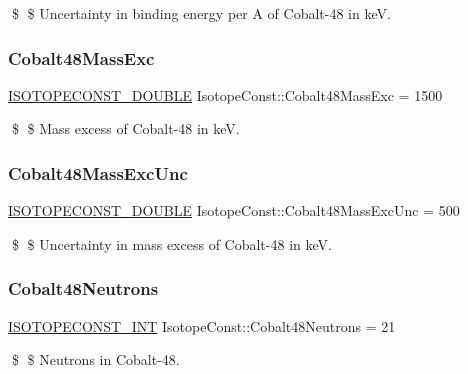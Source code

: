 \$ \$ Uncertainty in binding energy per A of Cobalt-\/48 in keV. \mbox{\label{group___isotope_const-_cobalt-_co48_ga537a142faa285ac28752f4d418c121f5}} 
\subsubsection{\texorpdfstring{Cobalt48\+Mass\+Exc}{Cobalt48MassExc}}
{\footnotesize\ttfamily \mbox{\hyperlink{group___isotope_const-_macros_ga8f45a7272ce02c0b4c65c44636ed719a}{I\+S\+O\+T\+O\+P\+E\+C\+O\+N\+S\+T\+\_\+\+D\+O\+U\+B\+LE}} Isotope\+Const\+::\+Cobalt48\+Mass\+Exc = 1500}

\$ \$ Mass excess of Cobalt-\/48 in keV. \mbox{\label{group___isotope_const-_cobalt-_co48_ga48d94eac10186954de6e5946862d9301}} 
\subsubsection{\texorpdfstring{Cobalt48\+Mass\+Exc\+Unc}{Cobalt48MassExcUnc}}
{\footnotesize\ttfamily \mbox{\hyperlink{group___isotope_const-_macros_ga8f45a7272ce02c0b4c65c44636ed719a}{I\+S\+O\+T\+O\+P\+E\+C\+O\+N\+S\+T\+\_\+\+D\+O\+U\+B\+LE}} Isotope\+Const\+::\+Cobalt48\+Mass\+Exc\+Unc = 500}

\$ \$ Uncertainty in mass excess of Cobalt-\/48 in keV. \mbox{\label{group___isotope_const-_cobalt-_co48_ga766e4783f9ff125c3c312e0a770e935d}} 
\subsubsection{\texorpdfstring{Cobalt48\+Neutrons}{Cobalt48Neutrons}}
{\footnotesize\ttfamily \mbox{\hyperlink{group___isotope_const-_macros_ga5f18360b3e99483a35c32d789e62621c}{I\+S\+O\+T\+O\+P\+E\+C\+O\+N\+S\+T\+\_\+\+I\+NT}} Isotope\+Const\+::\+Cobalt48\+Neutrons = 21}

\$ \$ Neutrons in Cobalt-\/48. \mbox{\label{group___isotope_const-_cobalt-_co48_ga21ccb58df1b57e67d8badedd37903a57}} 
